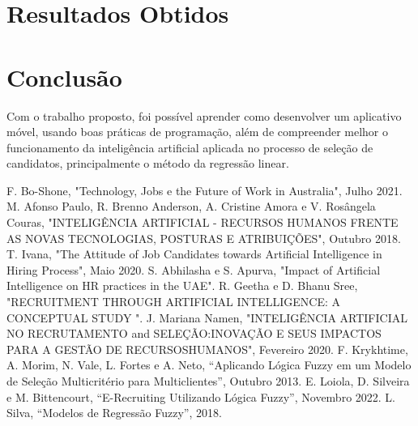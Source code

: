 \documentclass[conference]{IEEEtran}
\begin{document}
\section*{Resultados Obtidos}



\section*{Conclusão}
Com o trabalho proposto, foi possível aprender como desenvolver um aplicativo móvel, usando boas práticas de programação, além de compreender melhor o funcionamento da inteligência artificial aplicada no processo de seleção de candidatos, principalmente o método da regressão linear.

\begin{thebibliography}{00}
 F. Bo-Shone, "Technology, Jobs e the Future of Work in Australia", Julho 2021.
 M. Afonso Paulo, R. Brenno Anderson, A. Cristine Amora e V. Rosângela Couras, "INTELIGÊNCIA ARTIFICIAL - RECURSOS HUMANOS FRENTE AS NOVAS TECNOLOGIAS, POSTURAS E ATRIBUIÇÕES", Outubro 2018.
 T. Ivana, "The Attitude of Job Candidates towards Artificial Intelligence in Hiring Process", Maio 2020.
 S. Abhilasha e S. Apurva, "Impact of Artificial Intelligence on HR practices in the UAE".
 R. Geetha e D. Bhanu Sree, "RECRUITMENT THROUGH ARTIFICIAL INTELLIGENCE: A CONCEPTUAL STUDY ".
 J. Mariana Namen, "INTELIGÊNCIA ARTIFICIAL NO RECRUTAMENTO and SELEÇÃO:INOVAÇÃO E SEUS IMPACTOS PARA A GESTÃO DE RECURSOSHUMANOS", Fevereiro 2020.
 F. Krykhtime, A. Morim, N. Vale, L. Fortes e A. Neto, “Aplicando Lógica Fuzzy em um Modelo de Seleção Multicritério para Multiclientes”, Outubro 2013.
 E. Loiola, D. Silveira e M. Bittencourt, “E-Recruiting Utilizando Lógica Fuzzy”, Novembro 2022.
 L. Silva, “Modelos de Regressão Fuzzy”, 2018.
\end{thebibliography}
\vspace{12pt}
\end{document}
